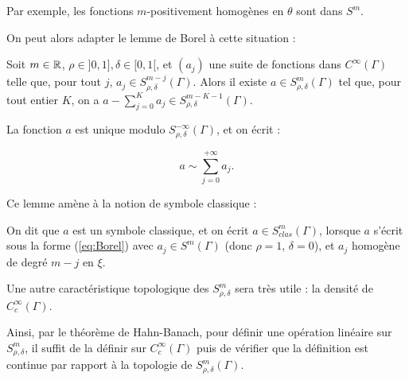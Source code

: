 Par exemple, les fonctions $m$-positivement homogènes en $\theta$ sont dans $S^m$.

On peut alors adapter le lemme de Borel à cette situation :

\begin{lem}\label{lem:Borel}
	Soit $m \in \mathbb{R}$, $\rho\in ]0,1], \delta \in [0,1[$, et $(a_j)$ une suite de fonctions dans $C^{\infty}(\Gamma)$ telle que, pour tout $j$, $a_j \in S^{m-j}_{\rho, \delta}(\Gamma)$. Alors il existe $a\in S^{m}_{\rho, \delta}(\Gamma)$ tel que, pour tout entier $K$, on a $a - \sum_{j=0}^Ka_j \in S^{m-K-1}_{\rho, \delta}(\Gamma)$.
	
	La fonction $a$ est unique modulo $S^{-\infty}_{\rho, \delta}(\Gamma)$, et on écrit :
	
	\begin{equation}
	\label{eq:Borel}
	a \sim \sum_{j=0}^{+\infty}a_j.
	\end{equation}
\end{lem}

Ce lemme amène à la notion de symbole classique :

\begin{defn}
	On dit que $a$ est un symbole classique, et on écrit $a \in S^m_{clas}(\Gamma)$, lorsque $a$ s'écrit sous la forme (\ref{eq:Borel}) avec $a_j \in S^m(\Gamma)$ (donc $\rho = 1$, $\delta = 0$), et $a_j$ homogène de degré $m-j$ en $\xi$.
\end{defn}

Une autre caractéristique topologique des $S^m_{\rho, \delta}$ sera très utile : la densité de $C^{\infty}_c(\Gamma)$.

Ainsi, par le théorème de Hahn-Banach, pour définir une opération linéaire sur $S^m_{\rho, \delta}$, il suffit de la définir sur $C^{\infty}_c(\Gamma)$ puis de vérifier que la définition est continue par rapport à la topologie de $S^m_{\rho, \delta}(\Gamma)$.

